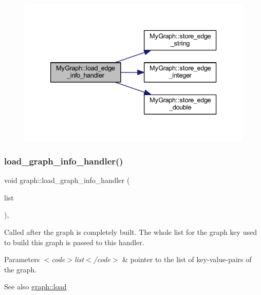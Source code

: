 \nopagebreak
\begin{figure}[H]
\begin{center}
\leavevmode
\includegraphics[width=333pt]{class_my_graph_aae6f9d1beab66851272f9064e2058064_cgraph}
\end{center}
\end{figure}
\mbox{\label{classgraph_aaca9ede8005388fd22b56e12280bf1bf}} 
\subsubsection{\texorpdfstring{load\+\_\+graph\+\_\+info\+\_\+handler()}{load\_graph\_info\_handler()}}
{\footnotesize\ttfamily void graph\+::load\+\_\+graph\+\_\+info\+\_\+handler (\begin{DoxyParamCaption}\item[{\mbox{\hyperlink{struct_g_m_l__pair}{G\+M\+L\+\_\+pair}} $\ast$}]{list }\end{DoxyParamCaption})\hspace{0.3cm}{\ttfamily [virtual]}, {\ttfamily [inherited]}}

Called after the graph is completely built. The whole list for the graph key used to build this graph is passed to this handler.


\begin{DoxyParams}{Parameters}
{\em $<$code$>$list$<$/code$>$} & pointer to the list of key-\/value-\/pairs of the graph. \\
\hline
\end{DoxyParams}
\begin{DoxySeeAlso}{See also}
\mbox{\hyperlink{classgraph_ac28cb3468623a480709d3329033d4ec8}{graph\+::load}} 
\end{DoxySeeAlso}


